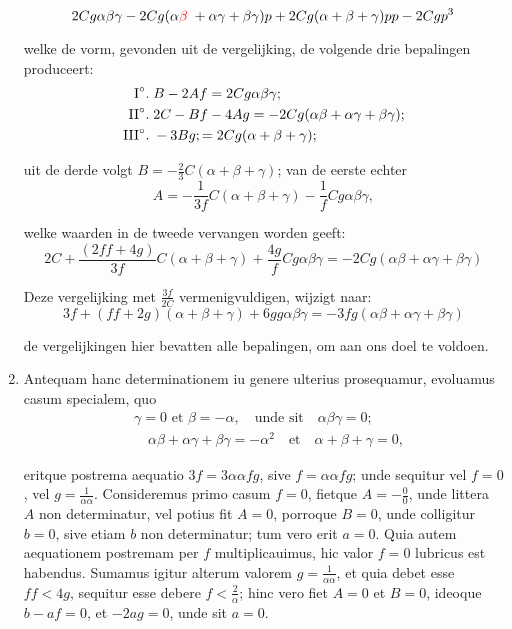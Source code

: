 \documentclass[10pt,a4paper]{article}
\begin{document}
\begin{paracol}{2}
\begin{enumerate}[topsep=1px]
		\[
			2Cg\alpha \beta \gamma - 2Cg(\alpha {\color{red}\beta\;}+\alpha \gamma+\beta \gamma)p+2Cg(\alpha+\beta+\gamma)pp - 2Cgp^3
		\]
		\par welke de vorm, gevonden uit de vergelijking, de volgende drie bepalingen produceert:
		\begin{align*}
			\text{I}\degree. \;& B-2Af = 2Cg\alpha\beta\gamma;\\
			\text{II}\degree. \; & 2C-Bf-4Ag = -2Cg(\alpha \beta +\alpha \gamma+\beta \gamma);\\
			\text{III}\degree. \; & -3Bg; = 2Cg(\alpha+\beta+\gamma);
		\end{align*}
		\par uit de derde volgt $B=-\frac{2}{3}C(\alpha+\beta+\gamma)$; van de eerste echter
		\[
			A = -\frac{1}{3f}C(\alpha+\beta+\gamma)-\frac{1}{f}Cg\alpha \beta \gamma,
		\]
		\par welke waarden in de tweede vervangen worden geeft:
		\[
			2C+\frac{(2ff+4g)}{3f}C(\alpha+ \beta + \gamma)+\frac{4g}{f}Cg\alpha \beta \gamma  = -2Cg(\alpha \beta + \alpha \gamma+\beta \gamma)
		\]
		\par Deze vergelijking met $\frac{3f}{2C}$ vermenigvuldigen, wijzigt naar:
		\[
			3f+(ff+2g)(\alpha+\beta+\gamma)+6gg\alpha  \beta \gamma = -3fg(\alpha \beta + \alpha \gamma + \beta \gamma)
		\]
		\par de vergelijkingen hier bevatten alle bepalingen, om aan ons doel te voldoen.		
		
		\switchcolumn*
		
		\item Antequam hanc determinationem iu genere ulterius prosequamur, evoluamus casum specialem, quo 
		\begin{align*}
			&\gamma = 0 \text{ et } \beta = -\alpha, \quad \text{unde sit} \quad \alpha\beta\gamma = 0;\\
			&\quad \alpha\beta+\alpha \gamma+\beta \gamma = -\alpha^2 \quad \text{et} \quad \alpha+\beta+ \gamma = 0,
		\end{align*}
		\par eritque postrema aequatio $3f = 3\alpha \alpha f g$, sive $f=\alpha \alpha fg$; unde sequitur vel $f= 0$, vel $g= \frac{1}{\alpha \alpha}$. Consideremus primo casum $f=0$, fietque $A = -\frac{0}{0}$, unde littera $A$ non determinatur, vel potius fit $A = 0$, porroque $B=0$, unde colligitur $b=0$, sive etiam $b$ non determinatur; tum vero erit $a=0$. Quia autem aequationem postremam per $f$ multiplicauimus, hic valor $f=0$ lubricus est habendus. Sumamus igitur alterum valorem $g= \frac{1}{\alpha \alpha}$, et quia debet esse $ff<4g$, sequitur esse debere $f< \frac{2}{\alpha}$; hinc vero fiet $A=0$ et $B=0$, ideoque $b-af = 0$, et $-2ag = 0$, unde sit $a = 0$.
		

\end{enumerate}
\end{paracol}
\end{document}
